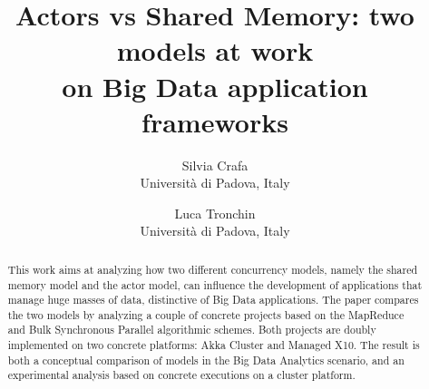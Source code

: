 \documentclass[a4paper]{article}
\numberwithin{equation}{section}
\begin{document}
\title{Actors vs Shared Memory: two models at work\\ on Big Data
   application frameworks}

\author{Silvia Crafa\\
        Universit\`a di Padova, Italy
       \and Luca Tronchin \\
        Universit\`a di Padova, Italy}
\date{}
\maketitle


\begin{abstract}
This work aims at analyzing how two different concurrency models,
namely the shared memory model and the actor model, can influence the
development of applications that manage huge masses of data,
distinctive of Big Data applications.  
The paper compares the two models by analyzing a
couple of concrete projects based on the MapReduce and Bulk
Synchronous Parallel algorithmic schemes. Both projects are
doubly implemented on two concrete platforms: Akka Cluster and Managed
X10.  
The result is both a conceptual comparison of models 
in the Big Data Analytics scenario, and an experimental analysis based
on concrete executions on a cluster platform.
\end{abstract}
\end{document}
